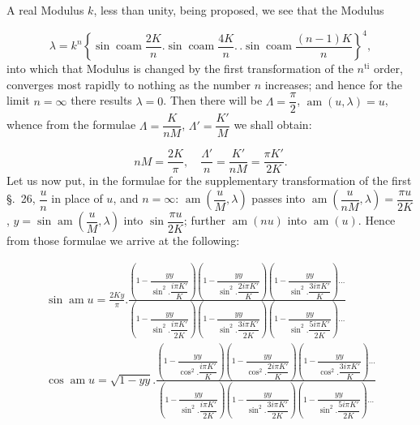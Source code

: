 \documentclass{article}
\begin{document}
A real Modulus $k$, less than unity, being proposed, we see that the Modulus

\[
\lambda=k^{n}\left\{\sin\operatorname{coam}\frac{2K}{n}.\sin\operatorname{coam}\frac{4K}{n}.\,.\sin\operatorname{coam}\frac{(n-1)K}{n}\right\}^{4},
\]
into which that Modulus is changed by the first transformation of the $n^{\mathrm{ti}}$ order, converges most rapidly to nothing as the number $n$ increases; and hence for the limit $n=\infty$ there results $\lambda=0$. Then there will be $\Lambda=\dfrac{\pi}{2}$, $\operatorname{am}(u,\lambda)=u$, whence from the formulae $\Lambda=\dfrac{K}{nM}$, $\Lambda'=\dfrac{K'}{M}$ we shall obtain:

\[
nM=\frac{2K}{\pi},\quad\frac{\Lambda'}{n}=\frac{K'}{nM}=\frac{\pi K'}{2K}.
\]
Let us now put, in the formulae for the supplementary transformation of the first §.\ 26, $\dfrac{u}{n}$ in place of $u$, and $n=\infty$: $\operatorname{am}\left(\dfrac{u}{M},\lambda\right)$ passes into $\operatorname{am}\left(\dfrac{u}{nM},\lambda\right)=\dfrac{\pi u}{2K}$, $y=\sin\operatorname{am}\left(\dfrac{u}{M},\lambda\right)$ into $\sin\dfrac{\pi u}{2K}$; further $\operatorname{am}(nu)$ into $\operatorname{am}(u)$. Hence from those formulae we arrive at the following:

\[
\begin{gathered}
\sin\operatorname{am}u=\frac{2Ky}{\pi}.\frac{\left(1-\dfrac{yy}{\sin^{2}.\dfrac{i\pi K'}{K}}\right)\left(1-\dfrac{yy}{\sin^{2}.\dfrac{2i\pi K'}{K}}\right)\left(1-\dfrac{yy}{\sin^{2}.\dfrac{3i\pi K'}{K}}\right)\ldots}{\left(1-\dfrac{yy}{\sin^{2}.\dfrac{i\pi K'}{2K}}\right)\left(1-\dfrac{yy}{\sin^{2}.\dfrac{3i\pi K'}{2K}}\right)\left(1-\dfrac{yy}{\sin^{2}.\dfrac{5i\pi K'}{2K}}\right)\ldots}\\[3ex]
\cos\operatorname{am}u=\sqrt{1-yy}.\frac{\left(1-\dfrac{yy}{\cos^{2}.\dfrac{i\pi K'}{K}}\right)\left(1-\dfrac{yy}{\cos^{2}.\dfrac{2i\pi K'}{K}}\right)\left(1-\dfrac{yy}{\cos^{2}.\dfrac{3i\pi K'}{K}}\right)\ldots}{\left(1-\dfrac{yy}{\sin^{2}.\dfrac{i\pi K'}{2K}}\right)\left(1-\dfrac{yy}{\sin^{2}.\dfrac{3i\pi K'}{2K}}\right)\left(1-\dfrac{yy}{\sin^{2}.\dfrac{5i\pi K'}{2K}}\right)\ldots}
\end{gathered}
\]
\end{document}
